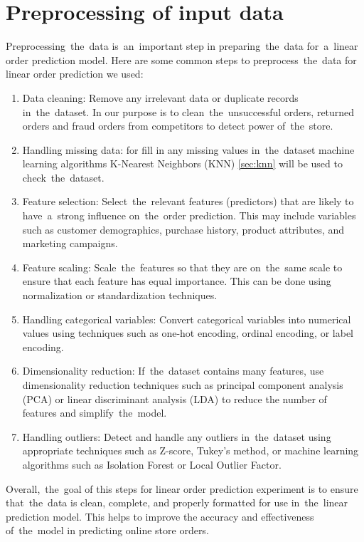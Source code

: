 \section{Preprocessing of input data}\label{subsec:preprocessing}
Preprocessing~the~data is~an~important step in preparing~the~data for~a~linear order prediction model.
Here are some common steps to preprocess~the~data for linear order prediction we used:

\begin{enumerate}
    \item Data cleaning: Remove any irrelevant data or duplicate records in~the~dataset. In our purpose is to
    clean~the~unsuccessful orders, returned orders and fraud orders from competitors to detect power of~the~store.
    \item Handling missing data: for fill in any missing values in~the~dataset machine learning algorithms
    K-Nearest Neighbors (KNN) \ref{sec:knn} will be used to check~the~dataset.
    \item Feature selection: Select~the~relevant features (predictors) that are likely to have~a~strong
    influence on~the~order prediction. This may include variables such as customer demographics, purchase
    history, product attributes, and marketing campaigns.
    \item Feature scaling: Scale~the~features so that they are on~the~same scale to ensure that each feature
    has equal importance. This can be done using normalization or standardization techniques.
    \item Handling categorical variables: Convert categorical variables into numerical values using techniques
    such as one-hot encoding, ordinal encoding, or label encoding.
    \item Dimensionality reduction: If~the~dataset contains many features, use dimensionality reduction techniques
    such as principal component analysis (PCA) or linear discriminant analysis (LDA) to reduce the
    number of features and simplify~the~model.
    \item Handling outliers: Detect and handle any outliers in~the~dataset using appropriate techniques
    such as Z-score, Tukey’s method, or machine learning algorithms such as Isolation Forest or Local Outlier Factor.
\end{enumerate}
Overall,~the~goal of this steps for linear order prediction experiment is to ensure that~the~data is clean,
complete, and properly formatted for use in~the~linear prediction model. This helps to improve the
accuracy and effectiveness of~the~model in predicting online store orders.

